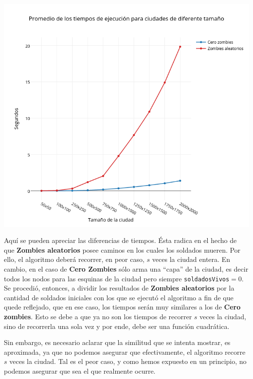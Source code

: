\includegraphics[width=15cm,keepaspectratio=yes]{imagenes/ej2/czyza.png}

Aquí se pueden apreciar las diferencias de tiempos. Ésta radica en el hecho de que \textbf{Zombies aleatorios} posee caminos en los cuales los soldados mueren. Por ello, el algoritmo deberá recorrer, en peor caso, $s$ veces la ciudad entera. En cambio, en el caso de \textbf{Cero Zombies} s\'olo arma una ``capa'' de la ciudad, es decir todos los nodos para las esquinas de la ciudad pero siempre \texttt{soldadosVivos}$=0$. \\

\newpage
Se procedió, entonces, a dividir los resultados de \textbf{Zombies aleatorios} por la cantidad de soldados iniciales con los que se ejecutó el algoritmo a fin de que quede reflejado, que en ese caso, los tiempos serán muy similares a los de \textbf{Cero zombies}. Esto se debe a que ya no son los tiempos de recorrer $s$ veces la ciudad, sino de recorrerla una sola vez y por ende, debe ser una función cuadrática.

Sin embargo, es necesario aclarar que la similitud que se intenta mostrar, es aproximada, ya que no podemos asegurar que efectivamente, el algoritmo recorre $s$ veces la ciudad. Tal es el peor caso, y como hemos expuesto en un principio, no podemos asegurar que sea el que realmente ocurre.

